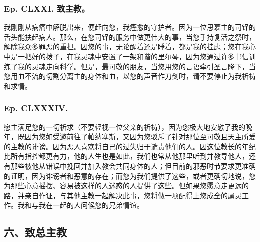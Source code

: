 
\subsubsection{Ep. CLXXI. 致主教。}

我刚刚从病痛中解脱出来，便赶向您，我痊愈的守护者。因为一位思慕主的司铎的舌头能扶起病人。那么，在您司铎的服务中做更伟大的事，当您手持复活之祭时，解除我众多罪恶的重担。因您的事，无论醒着还是睡着，都是我的挂虑；您在我心中是一把好的拨子，在我灵魂中安置了一架和谐的里尔琴，因为您通过许多书信训练了我的灵魂走向科学。但是，最可敬的朋友，当您用您的言语牵引圣言降下，当您用血不流的切割分离主的身体和血，以您的声音作刀剑时，请不要停止为我祈祷和求情。\par


\subsubsection{Ep. CLXXXIV.}

\par

愿主满足您的一切祈求（不要轻视一位父亲的祈祷），因为您极大地安慰了我的晚年，既因为您如受邀前往了帕纳塞斯，又因为您驳斥了针对那位至可敬且天主所爱的主教的诽谤。因为恶人喜欢将自己的过失归于谴责他们的人。因这位教长的年纪比所有指控都更有力，他的人生也是如此，我们也常从他那里听到并教导他人，还有那些被他从错误中挽回并加入教会共同身体的人；但目前的邪恶时节要求更准确的证明，因为诽谤者和恶意的存在；而您为我们提供了这些，或者更确切地说，您为那些心意摇摆、容易被这样的人迷惑的人提供了这些。但如果您愿意走更远的路，并亲自作证，与其他主教一起解决此事，您将做一项配得上您成全的属灵工作。我和与我在一起的人问候您的兄弟情谊。\par


\subsection{六、致总主教}

